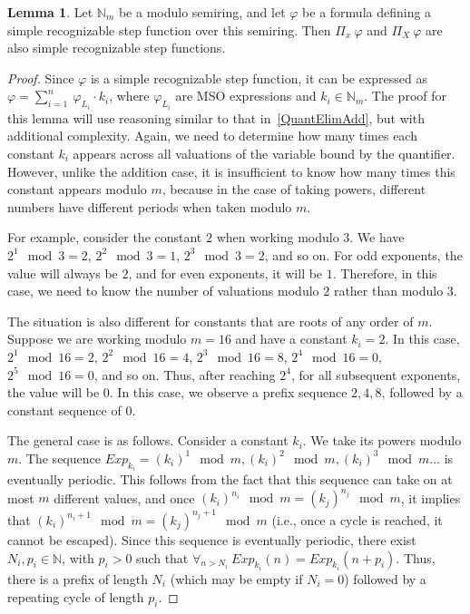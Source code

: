 \documentclass[en]{pracamgr}
\theoremstyle{definition}
\newtheorem{lemma}[theorem]{Lemma}
\begin{document}
\begin{lemma}
    \label{QuantElimMult}
    Let $\mathbb{N}_m$ be a modulo semiring, and let $\varphi$ be a formula defining a simple recognizable step function over this semiring. Then $\Pi_x \ \varphi$ and $\Pi_X \ \varphi$ are also simple recognizable step functions.
\end{lemma}

\begin{proof}
    Since $\varphi$ is a simple recognizable step function, it can be expressed as $\varphi = \sum_{i = 1}^{n} \ \varphi_{L_i} \cdot k_i$, where $\varphi_{L_i}$ are MSO expressions and $k_i \in \mathbb{N}_m$. The proof for this lemma will use reasoning similar to that in~\cref{QuantElimAdd}, but with additional complexity. Again, we need to determine how many times each constant $k_i$ appears across all valuations of the variable bound by the quantifier. However, unlike the addition case, it is insufficient to know how many times this constant appears modulo $m$, because in the case of taking powers, different numbers have different periods when taken modulo $m$. 
    
    For example, consider the constant $2$ when working modulo $3$. We have $2^1 \mod 3 = 2$, $2^2 \mod 3 = 1$, $2^3 \mod 3 = 2$, and so on. For odd exponents, the value will always be $2$, and for even exponents, it will be $1$. Therefore, in this case, we need to know the number of valuations modulo $2$ rather than modulo $3$. 

    The situation is also different for constants that are roots of any order of $m$. Suppose we are working modulo $m = 16$ and have a constant $k_i = 2$. In this case, $2^1 \mod 16 = 2$, $2^2 \mod 16 = 4$, $2^3 \mod 16 = 8$, $2^4 \mod 16 = 0$, $2^5 \mod 16 = 0$, and so on. Thus, after reaching $2^4$, for all subsequent exponents, the value will be $0$. In this case, we observe a prefix sequence $2,4,8$, followed by a constant sequence of $0$.

    The general case is as follows. Consider a constant $k_i$. We take its powers modulo $m$. The sequence $Exp_{k_i} = (k_i)^1 \mod m, (k_i)^2 \mod m, (k_i)^3 \mod m \ldots$ is eventually periodic. This follows from the fact that this sequence can take on at most $m$ different values, and once $(k_i)^{n_i} \mod m = (k_j)^{n_j} \mod m$, it implies that $(k_i)^{n_i + 1} \mod m = (k_j)^{n_j + 1} \mod m$ (i.e., once a cycle is reached, it cannot be escaped). Since this sequence is eventually periodic, there exist $N_i, p_i \in \mathbb{N}$, with $p_i > 0$ such that $\forall_{n > N_i} \ Exp_{k_i}(n) = Exp_{k_i}(n + p_i)$. Thus, there is a prefix of length $N_i$ (which may be empty if $N_i = 0$) followed by a repeating cycle of length $p_i$. 


\end{proof}
\end{document}
